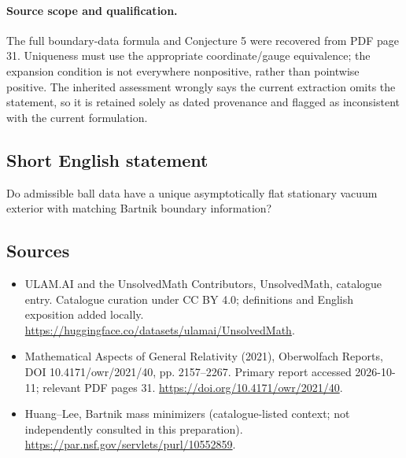 \documentclass[11pt]{article}
\begin{document}
\paragraph{Source scope and qualification.}
The full boundary-data formula and Conjecture 5 were recovered from PDF page 31. Uniqueness must use the appropriate coordinate/gauge equivalence; the expansion condition is not everywhere nonpositive, rather than pointwise positive. The inherited assessment wrongly says the current extraction omits the statement, so it is retained solely as dated provenance and flagged as inconsistent with the current formulation.
\subsection{Short English statement}
Do admissible ball data have a unique asymptotically flat stationary vacuum exterior with matching Bartnik boundary information?
\subsection{Sources}
\begin{itemize}
\item[\hypertarget{source:statement:1}{S1}] ULAM.AI and the UnsolvedMath Contributors, UnsolvedMath, catalogue entry. Catalogue curation under CC BY 4.0; definitions and English exposition added locally.
\url{https://huggingface.co/datasets/ulamai/UnsolvedMath}.
\item[\hypertarget{source:statement:2}{S2}] Mathematical Aspects of General Relativity (2021), Oberwolfach Reports, DOI 10.4171/owr/2021/40, pp. 2157--2267. Primary report accessed 2026-10-11; relevant PDF pages 31.
\url{https://doi.org/10.4171/owr/2021/40}.
\item[\hypertarget{source:statement:3}{S3}] Huang--Lee, Bartnik mass minimizers (catalogue-listed context; not independently consulted in this preparation).
\url{https://par.nsf.gov/servlets/purl/10552859}.
\end{itemize}
\label{end:statement}
\end{document}
